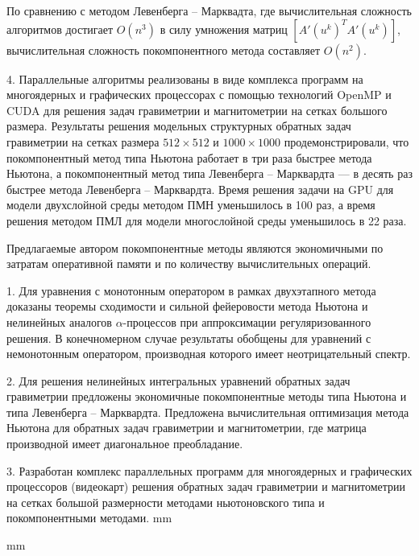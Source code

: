 \documentclass[%
autoref,     %
href,        %
colorlinks,  %
]{disser}
\begin{document}
По сравнению с методом Левенберга -- Марквадта, где вычислительная сложность алгоритмов достигает $O(n^3)$ в силу умножения матриц $[A'(u^k)^T A'(u^k)]$, вычислительная сложность покомпонентного метода составляет $O(n^2)$.

4. Параллельные алгоритмы реализованы в виде комплекса программ на многоядерных и графических процессорах с помощью технологий OpenMP и CUDA для решения задач гравиметрии и магнитометрии на сетках большого размера. 
Результаты решения модельных структурных обратных задач гравиметрии на сетках размера $512\times 512$ и $1000\times 1000$ продемонстрировали, что покомпонентный метод типа Ньютона работает в три раза быстрее метода Ньютона, а покомпонентный метод типа Левенберга -- Марквардта --- в десять раз быстрее метода Левенберга -- Марквардта. Время решения задачи на GPU для модели двухслойной среды методом ПМН уменьшилось в 100 раз, а время решения методом ПМЛ для модели многослойной среды уменьшилось в 22 раза. 

Предлагаемые автором покомпонентные методы являются экономичными по затратам оперативной памяти и по количеству вычислительных операций.

1. Для уравнения с монотонным оператором в рамках двухэтапного метода доказаны теоремы сходимости и сильной фейеровости метода Ньютона и нелинейных аналогов $\alpha$-процессов при аппроксимации регуляризованного решения. В конечномерном случае результаты обобщены для уравнений с немонотонным оператором, производная которого имеет неотрицательный спектр.

2. Для решения нелинейных интегральных уравнений обратных задач гравиметрии предложены экономичные покомпонентные методы типа Ньютона и типа Левенберга – Марквардта. Предложена вычислительная оптимизация метода Ньютона для обратных задач гравиметрии и магнитометрии, где матрица производной имеет диагональное преобладание. 

3. Разработан комплекс параллельных программ для многоядерных и графических процессоров (видеокарт) решения обратных задач гравиметрии и магнитометрии на сетках большой размерности методами ньютоновского типа и покомпонентными методами.
 mm 

\begingroup
\let\clearpage\relax
\printbibheading[title={Основные публикации по теме диссертации}]
 mm
\printbibliography[
heading=subbibliography,
keyword=hac,
title={Статьи в журналах из перечня ВАК}
]
\endgroup
\vspace {-10 mm}
\printbibliography[
heading=subbibliography,
keyword=scopus,
title={Публикации, проиндексированные в Scopus}
]
\vspace {-15 mm}
\printbibliography[
heading=subbibliography,
keyword=nohac,
title={Другие публикации}
]
\end{document}
